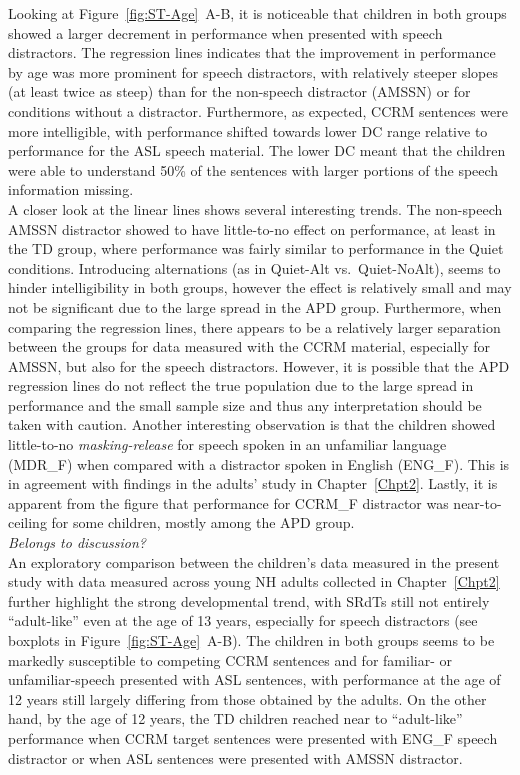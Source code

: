 \documentclass[a4paper, twoside]{templates/ociamthesis}
\begin{document}
Looking at Figure~\ref{fig:ST-Age}~A-B, it is noticeable that children in both groups showed a larger decrement in performance when presented with speech distractors. The regression lines indicates that the improvement in performance by age was more prominent for speech distractors, with relatively steeper slopes (at least twice as steep) than for the non-speech distractor (AMSSN) or for conditions without a distractor. Furthermore, as expected, CCRM sentences were more intelligible, with performance shifted towards lower DC range relative to performance for the ASL speech material. The lower DC meant that the children were able to understand 50\% of the sentences with larger portions of the speech information missing.\\

A closer look at the linear lines shows several interesting trends. The non-speech AMSSN distractor showed to have little-to-no effect on performance, at least in the TD group, where performance was fairly similar to performance in the Quiet conditions. Introducing alternations (as in Quiet-Alt vs.~Quiet-NoAlt), seems to hinder intelligibility in both groups, however the effect is relatively small and may not be significant due to the large spread in the APD group. Furthermore, when comparing the regression lines, there appears to be a relatively larger separation between the groups for data measured with the CCRM material, especially for AMSSN, but also for the speech distractors. However, it is possible that the APD regression lines do not reflect the true population due to the large spread in performance and the small sample size and thus any interpretation should be taken with caution. Another interesting observation is that the children showed little-to-no \emph{masking-release} for speech spoken in an unfamiliar language (MDR\_F) when compared with a distractor spoken in English (ENG\_F). This is in agreement with findings in the adults' study in Chapter~\ref{Chpt2}. Lastly, it is apparent from the figure that performance for CCRM\_F distractor was near-to-ceiling for some children, mostly among the APD group.\\

\colorbox[HTML]{CCCCFF}{\emph{Belongs to discussion?}}\\
An exploratory comparison between the children's data measured in the present study with data measured across young NH adults collected in Chapter~\ref{Chpt2} further highlight the strong developmental trend, with SRdTs still not entirely ``adult-like'' even at the age of 13 years, especially for speech distractors (see boxplots in Figure~\ref{fig:ST-Age}~A-B). The children in both groups seems to be markedly susceptible to competing CCRM sentences and for familiar- or unfamiliar-speech presented with ASL sentences, with performance at the age of 12 years still largely differing from those obtained by the adults. On the other hand, by the age of 12 years, the TD children reached near to ``adult-like'' performance when CCRM target sentences were presented with ENG\_F speech distractor or when ASL sentences were presented with AMSSN distractor.\\
\end{document}

